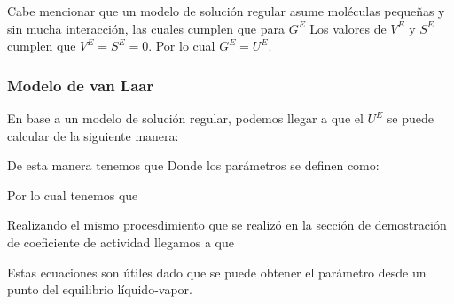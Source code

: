 Cabe mencionar que un modelo de solución regular asume moléculas pequeñas y sin mucha interacción, las cuales cumplen que para $G^{E}$
Los valores de $V^{E}$ y $S^{E}$ cumplen que $V^{E}=S^{E}=0$. Por lo cual $G^{E}=U^{E}$.

\subsubsection{Modelo de van Laar}

En base a un modelo de solución regular, podemos llegar a que el $U^{E}$ se puede calcular de la siguiente manera:


De esta manera tenemos que 
Donde los parámetros se definen como:


Por lo cual tenemos que 


Realizando el mismo procesdimiento que se realizó en la sección de demostración de coeficiente de actividad llegamos a que 

Estas ecuaciones son útiles dado que se puede obtener el parámetro desde un punto del equilibrio líquido-vapor.